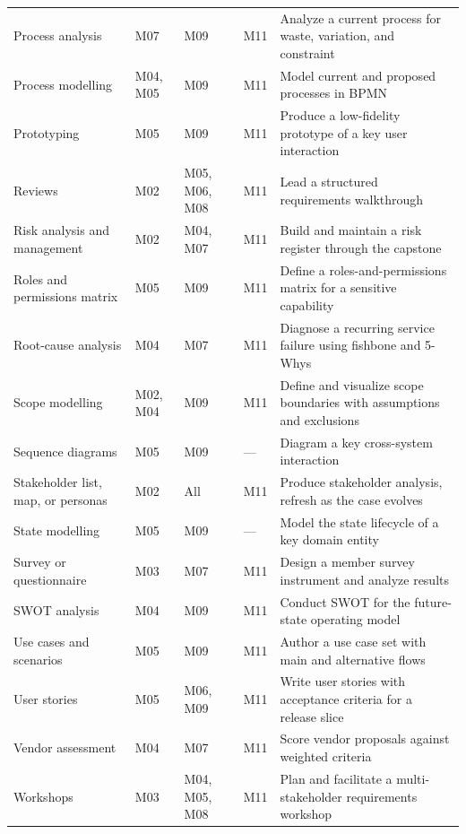\documentclass[11pt,letterpaper,oneside]{report}
\begin{document}
\begin{landscape}
\begin{longtable}{@{}R{4.45cm} R{2.10cm} R{2.55cm} R{1.55cm} R{8.40cm}@{}}
Process analysis                   & M07 & M09 & M11 & Analyze a current process for waste, variation, and constraint \\
Process modelling                  & M04, M05 & M09 & M11 & Model current and proposed processes in BPMN \\
Prototyping                        & M05 & M09 & M11 & Produce a low-fidelity prototype of a key user interaction \\
Reviews                            & M02 & M05, M06, M08 & M11 & Lead a structured requirements walkthrough \\
Risk analysis and management       & M02 & M04, M07 & M11 & Build and maintain a risk register through the capstone \\
Roles and permissions matrix       & M05 & M09 & M11 & Define a roles-and-permissions matrix for a sensitive capability \\
Root-cause analysis                & M04 & M07 & M11 & Diagnose a recurring service failure using fishbone and 5-Whys \\
Scope modelling                    & M02, M04 & M09 & M11 & Define and visualize scope boundaries with assumptions and exclusions \\
Sequence diagrams                  & M05 & M09 & ---  & Diagram a key cross-system interaction \\
Stakeholder list, map, or personas & M02 & All & M11 & Produce stakeholder analysis, refresh as the case evolves \\
State modelling                    & M05 & M09 & ---  & Model the state lifecycle of a key domain entity \\
Survey or questionnaire            & M03 & M07 & M11 & Design a member survey instrument and analyze results \\
SWOT analysis                      & M04 & M09 & M11 & Conduct SWOT for the future-state operating model \\
Use cases and scenarios            & M05 & M09 & M11 & Author a use case set with main and alternative flows \\
User stories                       & M05 & M06, M09 & M11 & Write user stories with acceptance criteria for a release slice \\
Vendor assessment                  & M04 & M07 & M11 & Score vendor proposals against weighted criteria \\
Workshops                          & M03 & M04, M05, M08 & M11 & Plan and facilitate a multi-stakeholder requirements workshop \\

\end{longtable}
\end{landscape}
\end{document}
